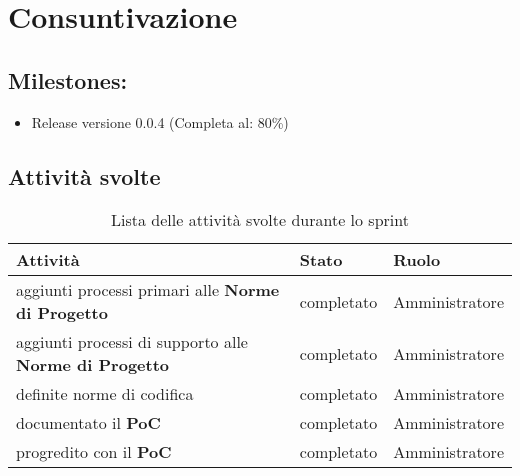 \section{Consuntivazione}

\subsection{Milestones:}
\begin{itemize}
    \item Release versione 0.0.4 (Completa al: 80\%)
\end{itemize}

\subsection{Attività svolte}

\begin{table}[ht]
    \begin{tabularx}{\textwidth}{X l l}
        
        \rowcolor{gray!30} \textbf{Attività} & \textbf{Stato} & \textbf{Ruolo}\\
        
        \hline
        aggiunti processi primari alle \textbf{Norme di Progetto} & completato & Amministratore\\
        aggiunti processi di supporto alle \textbf{Norme di Progetto} & completato & Amministratore\\
        definite norme di codifica & completato & Amministratore\\
        documentato il \textbf{PoC} & completato & Amministratore\\
        progredito con il \textbf{PoC}& completato & Amministratore\\
        \end{tabularx}
    \caption{Lista delle attività svolte durante lo sprint}
\end{table}


